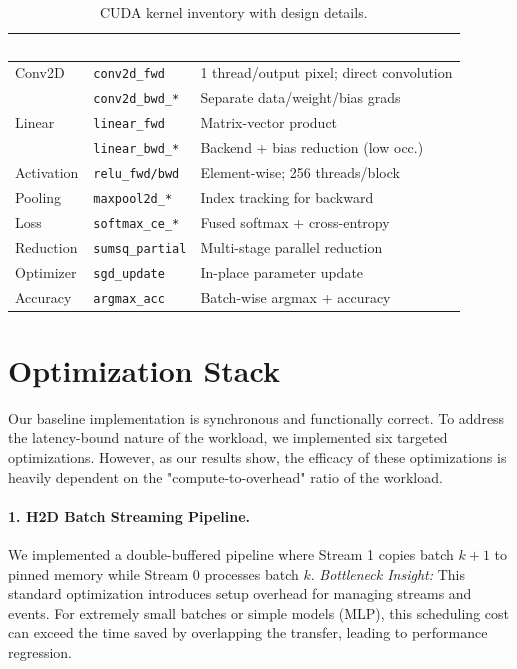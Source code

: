 \documentclass[10pt,twocolumn,letterpaper]{article}
\newcommand{\tablehead}[1]{\textcolor{white}{\textbf{#1}}}
\begin{document}
\begin{table}[H]
\centering
\caption{CUDA kernel inventory with design details.}
\label{tab:kernels}
\scriptsize
\renewcommand{\arraystretch}{1.2}
\begin{tabular}{l l p{2.8cm}}
\toprule
\rowcolor{tableheader}
\tablehead{Category} & \tablehead{Kernel} & \tablehead{Design} \\
\midrule
\rowcolor{tablerow1}
Conv2D & \texttt{conv2d\_fwd} & 1 thread/output pixel; direct convolution \\
\rowcolor{tablerow2}
 & \texttt{conv2d\_bwd\_*} & Separate data/weight/bias grads \\
\rowcolor{tablerow1}
Linear & \texttt{linear\_fwd} & Matrix-vector product \\
\rowcolor{tablerow2}
 & \texttt{linear\_bwd\_*} & Backend + bias reduction (low occ.) \\
\rowcolor{tablerow1}
Activation & \texttt{relu\_fwd/bwd} & Element-wise; 256 threads/block \\
\rowcolor{tablerow2}
Pooling & \texttt{maxpool2d\_*} & Index tracking for backward \\
\rowcolor{tablerow1}
Loss & \texttt{softmax\_ce\_*} & Fused softmax + cross-entropy \\
\rowcolor{tablerow2}
Reduction & \texttt{sumsq\_partial} & Multi-stage parallel reduction \\
\rowcolor{tablerow1}
Optimizer & \texttt{sgd\_update} & In-place parameter update \\
\rowcolor{tablerow2}
Accuracy & \texttt{argmax\_acc} & Batch-wise argmax + accuracy \\
\bottomrule
\end{tabular}
\end{table}

\section{Optimization Stack}
\label{sec:optim}

Our baseline implementation is synchronous and functionally correct.
To address the latency-bound nature of the workload, we implemented six targeted optimizations.
However, as our results show, the efficacy of these optimizations is heavily dependent on the "compute-to-overhead" ratio of the workload.

\paragraph{1. H2D Batch Streaming Pipeline.}
We implemented a double-buffered pipeline where Stream 1 copies batch $k+1$ to pinned memory while Stream 0 processes batch $k$.
\emph{Bottleneck Insight:} This standard optimization introduces setup overhead for managing streams and events. For extremely small batches or simple models (MLP), this scheduling cost can exceed the time saved by overlapping the transfer, leading to performance regression.
\end{document}
